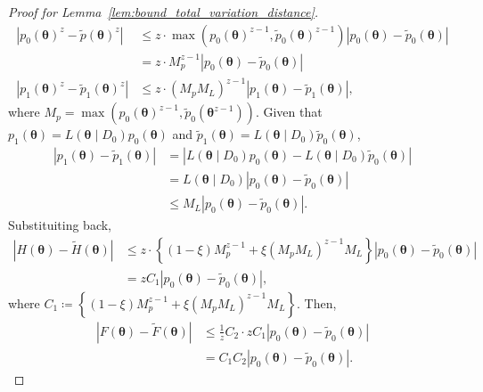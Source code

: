 \documentclass[12pt]{article}
\begin{document}
\begin{proof}[Proof for Lemma~\ref{lem:bound_total_variation_distance}]
\begin{align*}
        \left|p_0(\bm{\theta})^z - \tilde{p}(\bm{\theta})^z \right| &\leq z\cdot\max\left(p_0(\bm{\theta})^{z - 1}, \tilde{p}_0(\bm{\theta})^{z - 1}\right)|p_0(\bm{\theta}) - \tilde{p}_0(\bm{\theta})| \\
        &= z \cdot M_p^{z - 1} |p_0(\bm{\theta}) - \tilde{p}_0(\bm{\theta})| \\
        \left| p_1(\bm{\theta})^z - \tilde{p}_1(\bm{\theta})^z \right| &\leq z \cdot (M_p M_L)^{z - 1} \left|p_1(\bm{\theta}) - \tilde{p}_1(\bm{\theta})\right|,
    \end{align*}
    where $M_p = \max(p_0(\bm{\theta})^{z - 1}, \tilde{p}_0(\bm{\theta}^{z - 1}))$.
    Given that $p_1(\bm{\theta}) = L(\bm{\theta} \mid D_0)p_0(\bm{\theta})$ and $\tilde{p}_1(\bm{\theta}) = L(\bm{\theta} \mid D_0)\tilde{p}_0(\bm{\theta})$,
    \begin{align*}
        \left|p_1(\bm{\theta}) - \tilde{p}_1(\bm{\theta})\right| &= \left|L(\bm{\theta} \mid D_0)p_0(\bm{\theta}) - L(\bm{\theta} \mid D_0)\tilde{p}_0(\bm{\theta})\right| \\
        &= L(\bm{\theta} \mid D_0) \left|p_0(\bm{\theta}) - \tilde{p}_0(\bm{\theta})\right| \\
        &\leq M_L \left|p_0(\bm{\theta}) - \tilde{p}_0(\bm{\theta})\right|.
    \end{align*}
    Substituiting back,
    \begin{align*}
        \left| H(\bm{\theta}) - \tilde{H}(\bm{\theta}) \right| &\leq z \cdot \left\{(1 - \xi)M_p^{z - 1} + \xi (M_p M_L)^{z - 1} M_L \right\} |p_0(\bm{\theta}) - \tilde{p}_0(\bm{\theta})| \\
        &= z C_1 |p_0(\bm{\theta}) - \tilde{p}_0(\bm{\theta})|,
    \end{align*}
    where $C_1 \coloneqq \left\{(1 - \xi)M_p^{z - 1} + \xi (M_p M_L)^{z - 1} M_L \right\}$.
    Then,
    \begin{align}
        \left|F(\bm{\theta}) - \tilde{F}(\bm{\theta})\right| &\leq \frac{1}{z}C_2 \cdot z C_1 |p_0(\bm{\theta}) - \tilde{p}_0(\bm{\theta})| \nonumber \\
        &= C_1 C_2 |p_0(\bm{\theta}) - \tilde{p}_0(\bm{\theta})|. \label{eq:bound_for_f_f_tilde}
    \end{align}


\end{proof}
\end{document}
